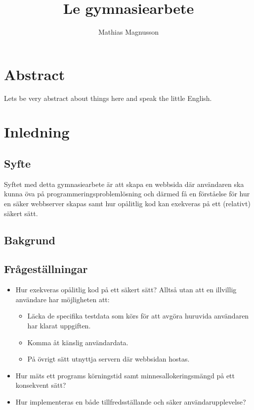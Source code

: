 \documentclass[swedish]{article}
\author{Mathias Magnusson}
\title{Le gymnasiearbete}
\date{}
\begin{document}
\maketitle{}

\section*{Abstract}

Lets be very abstract about things here and speak the little English.

\clearpage

\tableofcontents

\clearpage

\section{Inledning}

\subsection{Syfte}

Syftet med detta gymnasiearbete är att skapa en webbsida där användaren ska
kunna öva på programmeringsproblemlösning och därmed få en förståelse för hur
en säker webbserver skapas samt hur opålitlig kod kan exekveras på ett
(relativt) säkert sätt.

\subsection{Bakgrund}

\subsection{Frågeställningar}

\begin{itemize}
	\item Hur exekveras opålitlig kod på ett säkert sätt? Alltså utan att en
		illvillig användare har möjligheten att:
		\begin{itemize}
			\item Läcka de specifika testdata som körs för att avgöra huruvida
				användaren har klarat uppgiften.
			\item Komma åt känslig användardata.
			\item På övrigt sätt utnyttja servern där webbsidan hostas.
		\end{itemize}
	\item
		Hur mäts ett programs körningstid samt minnesallokeringsmängd på ett
		konsekvent sätt?
	\item
		Hur implementeras en både tillfredsställande och säker
		användarupplevelse?

\end{itemize}
\end{document}
